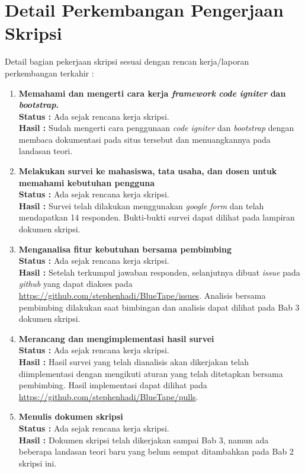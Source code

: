 \documentclass[a4paper,twoside]{article}
\begin{document}
\section{Detail Perkembangan Pengerjaan Skripsi}
Detail bagian pekerjaan skripsi sesuai dengan rencan kerja/laporan perkembangan terkahir :

\begin{enumerate}
	\item \textbf{Memahami dan mengerti cara kerja \textit{framework} \textit{code igniter} dan \textit{bootstrap}.}\\
	{\bf Status :} Ada sejak rencana kerja skripsi.\\
	{\bf Hasil :} Sudah mengerti cara penggunaan \textit{code igniter} dan \textit{bootstrap} dengan membaca dokumentasi pada situs tersebut dan menuangkannya pada landasan teori.
		
	\item \textbf{Melakukan survei ke mahasiswa, tata usaha, dan dosen untuk memahami kebutuhan pengguna}\\
	{\bf Status :} Ada sejak rencana kerja skripsi.\\		
	{\bf Hasil :} Survei telah dilakukan menggunakan \textit{google form} dan telah mendapatkan 14 responden. Bukti-bukti survei dapat dilihat pada lampiran dokumen skripsi.

	\item \textbf{Menganalisa fitur kebutuhan bersama pembimbing }\\
	{\bf Status :} Ada sejak rencana kerja skripsi.\\
	{\bf Hasil :} Setelah terkumpul jawaban responden, selanjutnya dibuat \textit{issue} pada \textit{github} yang dapat diakses pada \url{https://github.com/stephenhadi/BlueTape/issues}. Analisis bersama pembimbing dilakukan saat bimbingan dan analisis dapat dilihat pada Bab 3 dokumen skripsi.

	\item \textbf{Merancang dan mengimplementasi hasil survei}\\
	{\bf Status :} Ada sejak rencana kerja skripsi.\\
	{\bf Hasil :} Hasil survei yang telah dianalisis akan dikerjakan telah diimplementasi dengan mengikuti aturan yang telah ditetapkan bersama pembimbing. Hasil implementasi dapat dilihat pada \url{https://github.com/stephenhadi/BlueTape/pulls}.		
		
	\item \textbf{Menulis dokumen skripsi}\\
	{\bf Status :} Ada sejak rencana kerja skripsi.\\
	{\bf Hasil :} Dokumen skripsi telah dikerjakan sampai Bab 3, namun ada beberapa landasan teori baru yang belum sempat ditambahkan pada Bab 2 skripsi ini.		

\end{enumerate}
\end{document}
